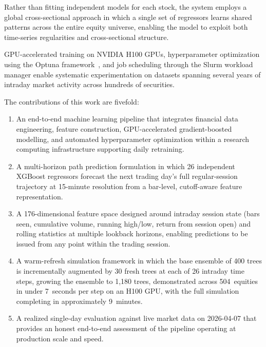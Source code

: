 \documentclass[conference]{IEEEtran}
\begin{document}
Rather than fitting independent models for each stock, the system employs a global cross-sectional approach in which a single set of regressors learns shared patterns across the entire equity universe, enabling the model to exploit both time-series regularities and cross-sectional structure.

GPU-accelerated training on NVIDIA H100 GPUs, hyperparameter optimization using the Optuna framework~\cite{akiba2019optuna}, and job scheduling through the Slurm workload manager enable systematic experimentation on datasets spanning several years of intraday market activity across hundreds of securities.

The contributions of this work are fivefold:
\begin{enumerate}
    \item An end-to-end machine learning pipeline that integrates financial data engineering, feature construction, GPU-accelerated gradient-boosted modelling, and automated hyperparameter optimization within a research computing infrastructure supporting daily retraining.

    \item A multi-horizon path prediction formulation in which 26 independent XGBoost regressors forecast the next trading day's full regular-session trajectory at 15-minute resolution from a bar-level, cutoff-aware feature representation.

    \item A 176-dimensional feature space designed around intraday session state (bars seen, cumulative volume, running high/low, return from session open) and rolling statistics at multiple lookback horizons, enabling predictions to be issued from any point within the trading session.

    \item A warm-refresh simulation framework in which the base ensemble of 400 trees is incrementally augmented by 30 fresh trees at each of 26 intraday time steps, growing the ensemble to 1{,}180 trees, demonstrated across 504~equities in under 7~seconds per step on an H100 GPU, with the full simulation completing in approximately 9~minutes.

    \item A realized single-day evaluation against live market data on 2026-04-07 that provides an honest end-to-end assessment of the pipeline operating at production scale and speed.
\end{enumerate}
\end{document}
